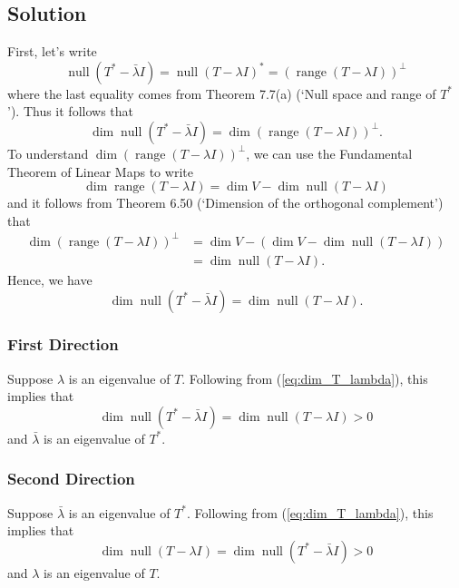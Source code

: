 \documentclass{article}
\begin{document}
\subsection*{Solution}
First, let's write 
\[\operatorname{null}(T^*-\bar{\lambda}I)=\operatorname{null}(T-\lambda I)^*=(\operatorname{range}(T-\lambda I))^\bot\]
where the last equality comes from Theorem 7.7(a) (`Null space and range of $T^*$'). 
Thus it follows that 
\[\operatorname{dim}\operatorname{null}(T^*-\bar{\lambda}I)=\operatorname{dim}(\operatorname{range}(T-\lambda I))^\bot.\]
To understand $\operatorname{dim}(\operatorname{range}(T-\lambda I))^\bot$, we can use the Fundamental Theorem of Linear Maps to write
\[\operatorname{dim}\operatorname{range}(T-\lambda I)=\operatorname{dim}V-\operatorname{dim}\operatorname{null}(T-\lambda I)\]
and it follows from Theorem 6.50 (`Dimension of the orthogonal complement') that
\begin{align*}
    \operatorname{dim}(\operatorname{range}(T-\lambda I))^\bot&=\operatorname{dim}V-(\operatorname{dim}V-\operatorname{dim}\operatorname{null}(T-\lambda I))\\
    &=\operatorname{dim}\operatorname{null}(T-\lambda I).
\end{align*}
Hence, we have
\begin{equation}\label{eq:dim_T_lambda}
    \operatorname{dim}\operatorname{null}(T^*-\bar{\lambda}I)=\operatorname{dim}\operatorname{null}(T-\lambda I).
\end{equation}

\subsubsection*{First Direction}
Suppose $\lambda$ is an eigenvalue of $T$. 
Following from (\ref{eq:dim_T_lambda}), this implies that 
\[\operatorname{dim}\operatorname{null}(T^*-\bar{\lambda}I)=\operatorname{dim}\operatorname{null}(T-\lambda I)>0\]
and $\bar{\lambda}$ is an eigenvalue of $T^*$.

\subsubsection*{Second Direction}
Suppose $\bar{\lambda}$ is an eigenvalue of $T^*$. 
Following from (\ref{eq:dim_T_lambda}), this implies that 
\[\operatorname{dim}\operatorname{null}(T-\lambda I)=\operatorname{dim}\operatorname{null}(T^*-\bar{\lambda}I)>0\]
and $\lambda$ is an eigenvalue of $T$.

\clearpage
\end{document}
